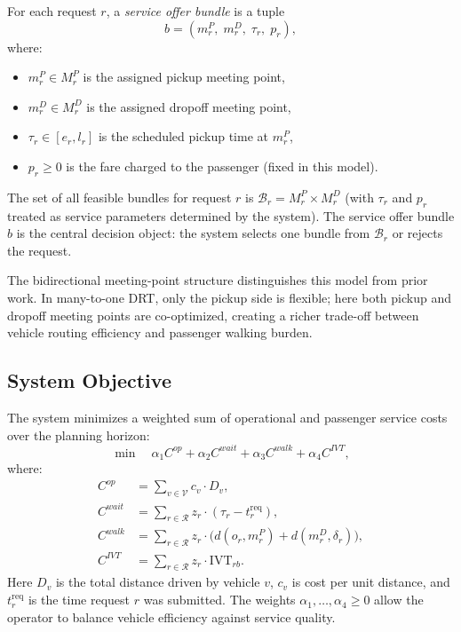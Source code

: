 For each request $r$, a \emph{service offer bundle} is a tuple
\[
  b = (m_r^P,\; m_r^D,\; \tau_r,\; p_r),
\]
where:
\begin{itemize}
  \item $m_r^P \in M_r^P$ is the assigned pickup meeting point,
  \item $m_r^D \in M_r^D$ is the assigned dropoff meeting point,
  \item $\tau_r \in [e_r, l_r]$ is the scheduled pickup time at $m_r^P$,
  \item $p_r \geq 0$ is the fare charged to the passenger (fixed in this model).
\end{itemize}
The set of all feasible bundles for request $r$ is $\mathcal{B}_r = M_r^P \times M_r^D$
(with $\tau_r$ and $p_r$ treated as service parameters determined by the system).
The service offer bundle $b$ is the central decision object: the system selects one bundle
from $\mathcal{B}_r$ or rejects the request.

The bidirectional meeting-point structure distinguishes this model from prior work. In
many-to-one DRT, only the pickup side is flexible; here both pickup and dropoff meeting
points are co-optimized, creating a richer trade-off between vehicle routing efficiency
and passenger walking burden.

\subsection{System Objective}

The system minimizes a weighted sum of operational and passenger service costs over the
planning horizon:
\begin{equation}\label{eq:objective}
  \min \quad \alpha_1 C^{op} + \alpha_2 C^{wait} + \alpha_3 C^{walk}
             + \alpha_4 C^{IVT},
\end{equation}
where:
\begin{align}
  C^{op}   &= \sum_{v \in \mathcal{V}} c_v \cdot D_v, \label{eq:cop}\\
  C^{wait} &= \sum_{r \in \mathcal{R}} z_r \cdot (\tau_r - t_r^{\text{req}}), \label{eq:cwait}\\
  C^{walk} &= \sum_{r \in \mathcal{R}} z_r \cdot \bigl(d(o_r, m_r^P) + d(m_r^D, \delta_r)\bigr), \label{eq:cwalk}\\
  C^{IVT}  &= \sum_{r \in \mathcal{R}} z_r \cdot \text{IVT}_{rb}. \label{eq:civt}
\end{align}
Here $D_v$ is the total distance driven by vehicle $v$, $c_v$ is cost per unit distance,
and $t_r^{\text{req}}$ is the time request $r$ was submitted.
The weights $\alpha_1, \ldots, \alpha_4 \geq 0$ allow the operator to balance
vehicle efficiency against service quality.

